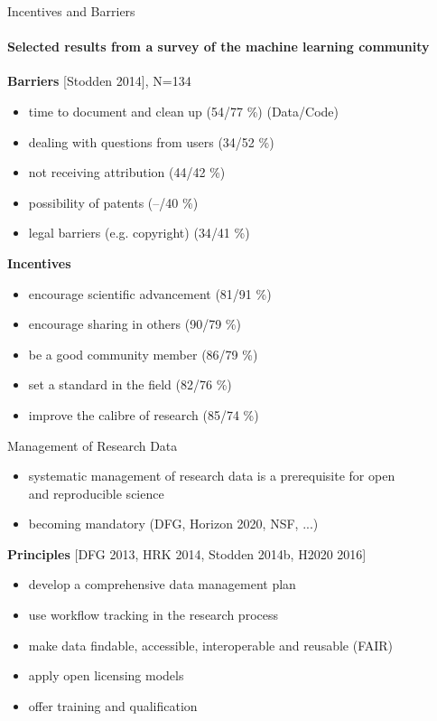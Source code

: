 \documentclass{intbeamer}
\newcommand\data[1]{{\color{structure.fg}#1}}
\begin{document}
\begin{frame}{Incentives and Barriers}
\framesubtitle{Selected results from a survey of the machine learning community}

\textbf{Barriers} {\tiny [Stodden 2014], N=134}
\begin{itemize}
\item time to document and clean up (\data{54}/77 \%) \hfill (\data{Data}/Code)
\item dealing with questions from users (\data{34}/52 \%)
\item not receiving attribution (\data{44}/42 \%)
\item possibility of patents (\data{--}/40 \%)
\item legal barriers (e.g. copyright) (\data{34}/41 \%)
\end{itemize}

\vspace{3mm}

\textbf{Incentives}
\begin{itemize}
\item encourage scientific advancement (\data{81}/91 \%)
\item encourage sharing in others (\data{90}/79 \%)
\item be a good community member (\data{86}/79 \%)
\item set a standard in the field (\data{82}/76 \%)
\item improve the calibre of research (\data{85}/74 \%)
\end{itemize}

\end{frame}


\begin{frame}{Management of Research Data}

\begin{itemize}
\item systematic management of research data is a prerequisite for open \\ and reproducible science
\item becoming mandatory (DFG, Horizon 2020, NSF, ...)
\end{itemize}

\vfill

\textbf{Principles} {\tiny [DFG 2013, HRK 2014, Stodden 2014b, H2020 2016]}
\begin{itemize}
\item develop a comprehensive data management plan
\item use workflow tracking in the research process
\item make data findable, accessible, interoperable and reusable (FAIR)
\item apply open licensing models
\item offer training and qualification
\end{itemize}

\end{frame}
\end{document}
